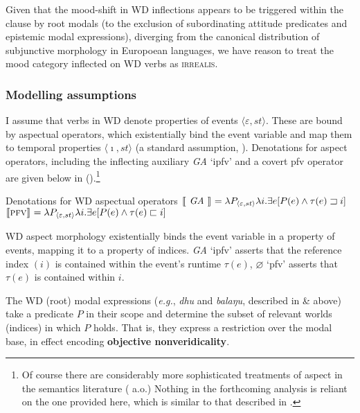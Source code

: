 Given that the mood-shift in WD inflections appears to be triggered within the clause by root modals (to the exclusion of subordinating attitude predicates and epistemic modal expressions), diverging from the canonical distribution of subjunctive morphology in Europoean languages, we have reason \citep[following][]{Palmer2001} to treat the mood category inflected on WD verbs as \textsc{irrealis}.

\subsubsection{Modelling assumptions}

I assume that verbs in WD denote properties of events $ \langle \varepsilon,st\rangle $. These are bound by aspectual operators, which existentially bind the event variable and map them to temporal properties $ \langle\imath,st\rangle $  (a standard assumption, \citealp[see][]{Kratzer1998}). Denotations for aspect operators, including the inflecting auxiliary \textit{GA} `\gls{ipfv}' and a covert \gls{pfv} operator are given below in (\nextx).\footnote{Of course there are considerably more sophisticated treatments of aspect in the semantics literature (\citealp[e.g.,][]{Deo2009a,Dowty1979} a.o.) Nothing in the forthcoming analysis is reliant on the one provided here, which is similar to that described in \citet{Taylor1977}.}

\pex Denotations for WD aspectual operators
\a$ \llbracket{\textit{ GA }}\rrbracket^{}= \lambda P_{\langle\varepsilon,st\rangle}\lambda i.
\exists e[P(e)\wedge \tau(e)\sqsupset i]$
\a$ \llbracket{\textsc{pfv}}\rrbracket^{}= \lambda P_{\langle\varepsilon,st\rangle}\lambda i.
\exists e[P(e)\wedge \tau(e)\sqsubset i]$

\xe
WD aspect morphology existentially binds the event variable in a property of events, mapping it to a property of indices. \textit{GA} `\gls{ipfv}' asserts that the reference index $ (i) $ is contained within the event's runtime $ \tau(e) $, $ \varnothing $ `\gls{pfv}' asserts that $ \tau(e) $ is contained within $ i $.

The WD (root) modal expressions (\textit{e.g.}, \textit{dhu} and \textit{balaŋu}, described in  \&  above) take a predicate $ P $ in their scope and determine the subset of relevant worlds (indices) in which $ P $ holds. That is, they express a restriction over the modal base, in effect encoding \textbf{objective nonveridicality}.




